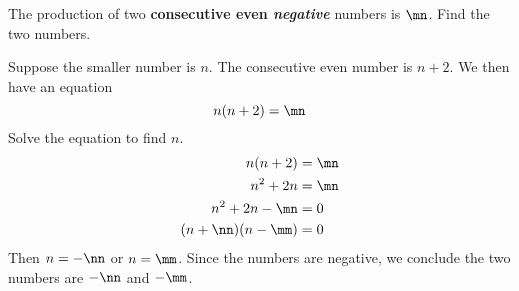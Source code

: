 







\pgfmathtruncatemacro{\mn}{\mm*\nn}




The production of two \textbf{consecutive even \textit{negative} } numbers is $\mn$. Find the two numbers.


\begin{solution}

Suppose the smaller number is $n$. The consecutive even number is $n+2$. We then have an equation
\[ n(n+2)=\mn \] 
Solve the equation to find $n$.
\[
\begin{split}
	n(n+2)&=\mn \\
	n^2+2n&=\mn\\
	n^2+2n-\mn&=0\\
	(n+\nn)(n-\mm)&=0\\
\end{split}
\]
Then $n=-\nn$ or $n=\mm$. Since the numbers are negative, we conclude the two numbers are $-\nn$ and $-\mm$.
\end{solution}